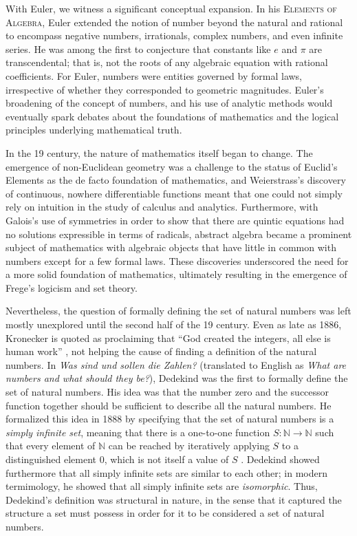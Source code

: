 With Euler, we witness a significant conceptual expansion. In his \textsc{Elements of Algebra}, Euler extended the notion of number beyond the natural and rational to encompass negative numbers, irrationals, complex numbers, and even infinite series. He was among the first to conjecture that constants like $e$ and $\pi$ are transcendental; that is, not the roots of any algebraic equation with rational coefficients. For Euler, numbers were entities governed by formal laws, irrespective of whether they corresponded to geometric magnitudes. Euler's broadening of the concept of numbers, and his use of analytic methods would eventually spark debates about the foundations of mathematics and the logical principles underlying mathematical truth.

In the 19\supth{} century, the nature of mathematics itself began to change. The emergence of non-Euclidean geometry was a challenge to the status of Euclid's Elements as the de facto foundation of mathematics, and Weierstrass's discovery of continuous, nowhere differentiable functions meant that one could not simply rely on intuition in the study of calculus and analytics. Furthermore, with Galois's use of symmetries in order to show that there are quintic equations had no solutions expressible in terms of radicals, abstract algebra became a prominent subject of mathematics with algebraic objects that have little in common with numbers except for a few formal laws. These discoveries underscored the need for a more solid foundation of mathematics, ultimately resulting in the emergence of Frege's logicism and set theory.

Nevertheless, the question of formally defining the set of natural numbers was left mostly unexplored until the second half of the 19\supth{} century. Even as late as 1886, Kronecker is quoted as proclaiming that ``God created the integers, all else is human work'' \cite{weber1893}, not helping the cause of finding a definition of the natural numbers. In \emph{Was sind und sollen die Zahlen?} (translated to English as \emph{What are numbers and what should they be?}), Dedekind was the first to formally define the set of natural numbers. His idea was that the number zero and the successor function together should be sufficient to describe all the natural numbers. He formalized this idea in 1888 by specifying that the set of natural numbers is a \emph{simply infinite set}, meaning that there is a one-to-one function $S:\mathbb{N}\to\mathbb{N}$ such that every element of $\mathbb{N}$ can be reached by iteratively applying $S$ to a distinguished element $0$, which is not itself a value of $S$ \cite{dedekind1888}. Dedekind showed furthermore that all simply infinite sets are similar to each other; in modern termimology, he showed that all simply infinite sets are \emph{isomorphic}. Thus, Dedekind's definition was structural in nature, in the sense that it captured the structure a set must possess in order for it to be considered a set of natural numbers.

